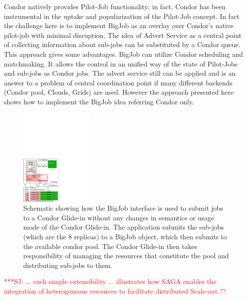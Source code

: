 \documentclass[conference,final]{IEEEtran}
\newcommand{\jhanote}[1]{ {\textcolor{red} { ***SJ: #1 }}}
\newcommand{\jhanote}[1]{}
\begin{document}
Condor natively provides Pilot-Job functionality; in fact, Condor has
been instrumental in the uptake and popularization of the Pilot-Job
concept.
In fact the challenge here is to implement BigJob as an overlay over
Condor's native pilot-job with minimal disruption. The idea of Advert
Service as a central point of collecting information about sub-jobs
can be substituted by a Condor queue. This approach gives some
advantages.  BigJob can utilize Condor scheduling and matchmaking. It
allows the control in an unified way of the state of Pilot-Jobs and
sub-jobs as Condor jobs. The advert service still can be applied and
is an answer to a problem of central coordination point if many
different backends (Condor pool, Clouds, Grids) are used.  However the
approach presented here shows how to implement the BigJob idea
referring Condor only.

\begin{figure}[!ht]
 \begin{center}
     \includegraphics[width=0.33\textwidth]{figures/bigjob_condor}
 \end{center}
 \caption{\small Schematic showing how the BigJob interface is used to
   submit jobs to a Condor Glide-in without any changes in semantics
   or usage mode of the Condor Glide-in. The application submits the
   sub-jobs (which are the 8 replicas) to a BigJob object, which then
   submits to the available condor pool. The Condor Glide-in then
   takes responsibility of managing the resources that constitute the
   pool and distributing sub-jobs to them.} \label{fig:saga-condor}
\end{figure}

\jhanote{... such simple extensibility ... illustrates how SAGA
  enables the integration of heterogeneous resources to facilitate
  distributed Scale-out.??}
\end{document}

